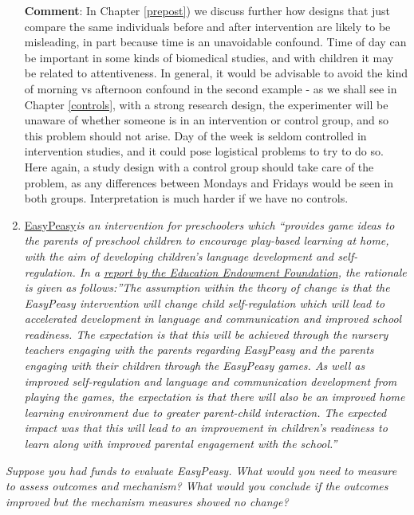 \documentclass{krantz}
\begin{document}
\begin{enumerate}
  \textbf{Comment}: In Chapter \ref{prepost}) we discuss further how designs that just compare the same individuals before and after intervention are likely to be misleading, in part because time is an unavoidable confound. Time of day can be important in some kinds of biomedical studies, and with children it may be related to attentiveness. In general, it would be advisable to avoid the kind of morning vs afternoon confound in the second example - as we shall see in Chapter \ref{controls}, with a strong research design, the experimenter will be unaware of whether someone is in an intervention or control group, and so this problem should not arise. Day of the week is seldom controlled in intervention studies, and it could pose logistical problems to try to do so. Here again, a study design with a control group should take care of the problem, as any differences between Mondays and Fridays would be seen in both groups. Interpretation is much harder if we have no controls.
\item
  \href{https://guidebook.eif.org.uk/programme/easypeasy}{EasyPeasy}\emph{is an intervention for preschoolers which ``provides game ideas to the parents of preschool children to encourage play-based learning at home, with the aim of developing children's language development and self-regulation. In a \href{https://d2tic4wvo1iusb.cloudfront.net/documents/projects/EasyPeasy.pdf?v=1686132397}{report by the Education Endowment Foundation}, the rationale is given as follows:''The assumption within the theory of change is that the EasyPeasy intervention will change child self-regulation which will lead to accelerated development in language and communication and improved school readiness. The expectation is that this will be achieved through the nursery teachers engaging with the parents regarding EasyPeasy and the parents engaging with their children through the EasyPeasy games. As well as improved self-regulation and language and communication development from playing the games, the expectation is that there will also be an improved home learning environment due to greater parent-child interaction. The expected impact was that this will lead to an improvement in children's readiness to learn along with improved parental engagement with the school.''}
\end{enumerate}

\emph{Suppose you had funds to evaluate EasyPeasy. What would you need to measure to assess outcomes and mechanism? What would you conclude if the outcomes improved but the mechanism measures showed no change?}
\end{document}
